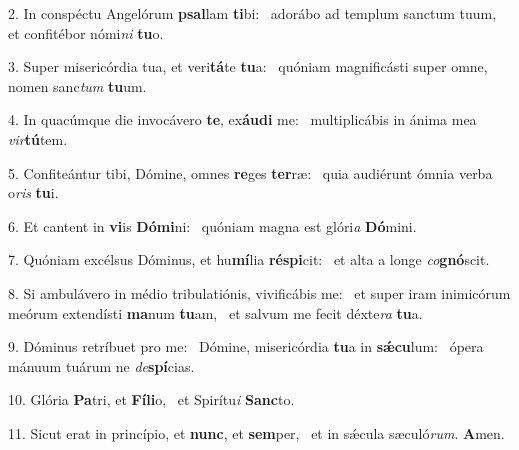 2. In conspéctu Angelórum \textbf{psal}lam \textbf{ti}bi: \ast\  adorábo ad templum sanctum tuum, et confitébor nómi\textit{ni} \textbf{tu}o.\

3. Super misericórdia tua, et veri\textbf{tá}te \textbf{tu}a: \ast\  quóniam magnificásti super omne, nomen sanc\textit{tum} \textbf{tu}um.\

4. In quacúmque die invocávero \textbf{te}, ex\textbf{áu}\textbf{di} me: \ast\  multiplicábis in ánima mea \textit{vir}\textbf{tú}tem.\

5. Confiteántur tibi, Dómine, omnes \textbf{re}ges \textbf{ter}ræ: \ast\  quia audiérunt ómnia verba o\textit{ris} \textbf{tu}i.\

6. Et cantent in \textbf{vi}is \textbf{Dó}\textbf{mi}ni: \ast\  quóniam magna est glóri\textit{a} \textbf{Dó}mini.\

7. Quóniam excélsus Dóminus, et hu\textbf{mí}lia \textbf{ré}\textbf{spi}cit: \ast\  et alta a longe \textit{co}\textbf{gnó}scit.\

8. Si ambulávero in médio tribulatiónis, vivificábis me: \dag\  et super iram inimicórum meórum extendísti \textbf{ma}num \textbf{tu}am, \ast\  et salvum me fecit déxte\textit{ra} \textbf{tu}a.\

9. Dóminus retríbuet pro me: \dag\  Dómine, misericórdia \textbf{tu}a in \textbf{sǽ}\textbf{cu}lum: \ast\  ópera mánuum tuárum ne \textit{de}\textbf{spí}cias.\

10. Glória \textbf{Pa}tri, et \textbf{Fí}\textbf{li}o, \ast\  et Spirítu\textit{i} \textbf{Sanc}to.\

11. Sicut erat in princípio, et \textbf{nunc}, et \textbf{sem}per, \ast\  et in sǽcula sæculó\textit{rum}. \textbf{A}men.\

